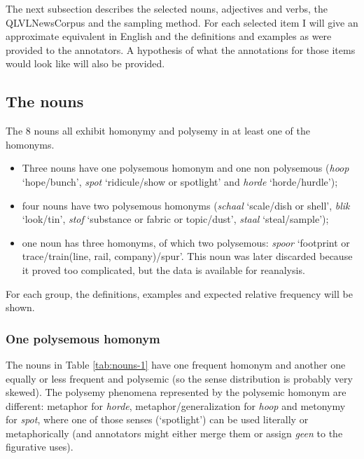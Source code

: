 \documentclass[
]{book}
\begin{document}
The next subsection describes the selected nouns, adjectives and verbs, the QLVLNewsCorpus and the sampling method. For each selected item I will give an approximate equivalent in English and the definitions and examples as were provided to the annotators. A hypothesis of what the annotations for those items would look like will also be provided.

\hypertarget{nouns}{%
\subsection{The nouns}\label{nouns}}

The 8 nouns all exhibit homonymy and polysemy in at least one of the homonyms.

\begin{itemize}
\item
  Three nouns have one polysemous homonym and one non polysemous (\emph{hoop} `hope/bunch', \emph{spot} `ridicule/show or spotlight' and \emph{horde} `horde/hurdle');
\item
  four nouns have two polysemous homonyms (\emph{schaal} `scale/dish or shell', \emph{blik} `look/tin', \emph{stof} `substance or fabric or topic/dust', \emph{staal} `steal/sample');
\item
  one noun has three homonyms, of which two polysemous: \emph{spoor} `footprint or trace/train(line, rail, company)/spur'. This noun was later discarded because it proved too complicated, but the data is available for reanalysis.
\end{itemize}

For each group, the definitions, examples and expected relative frequency will be shown.

\hypertarget{one-polysemous-homonym}{%
\subsubsection{One polysemous homonym}\label{one-polysemous-homonym}}

The nouns in Table \ref{tab:nouns-1} have one frequent homonym and another one equally or less frequent and polysemic (so the sense distribution is probably very skewed). The polysemy phenomena represented by the polysemic homonym are different: metaphor for \emph{horde}, metaphor/generalization for \emph{hoop} and metonymy for \emph{spot}, where one of those senses (`spotlight') can be used literally or metaphorically (and annotators might either merge them or assign \emph{geen} to the figurative uses).
\end{document}
